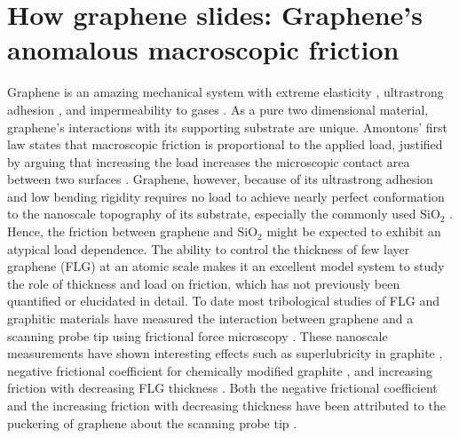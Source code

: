 \chapter{How graphene slides: Graphene's anomalous macroscopic friction \label{chap:fri}}

Graphene is an amazing mechanical system with extreme elasticity \cite{Lee2008}, ultrastrong adhesion \cite{Koenig2011}, and impermeability to gases \cite{Bunch2008}.
As a pure two dimensional material, graphene's interactions with its supporting substrate are unique.
Amontons' first law states that macroscopic friction is proportional to the applied load, justified by arguing that increasing the load increases the microscopic contact area between two surfaces \cite{Krim1996}.
Graphene, however, because of its ultrastrong adhesion \cite{Koenig2011} and low bending rigidity requires no load to achieve nearly perfect conformation to the nanoscale topography of its substrate, especially the commonly used $\mathrm{SiO_2}$ \cite{Stolyarova2007,Lui2009,Cullen2010}.
Hence, the friction between graphene and $\mathrm{SiO_2}$ might be expected to exhibit an atypical load dependence.
The ability to control the thickness of few layer graphene (FLG) at an atomic scale makes it an excellent model system to study the role of thickness and load on friction, which has not previously been quantified or elucidated in detail.
To date most tribological studies of FLG and graphitic materials have measured the interaction between graphene and a scanning probe tip using frictional force microscopy \cite{Dienwiebel2004,Deng2012,Lee2010,Li2010c,Filleter2009,Filleter2010,Zhang2012a}.
These nanoscale measurements have shown interesting effects such as superlubricity in graphite \cite{Dienwiebel2004}, negative frictional coefficient for chemically modified graphite \cite{Deng2012}, and increasing friction with decreasing FLG thickness \cite{Lee2010,Li2010c,Filleter2009,Filleter2010}.
Both the negative frictional coefficient and the increasing friction with decreasing thickness have been attributed to the puckering of graphene about the scanning probe tip \cite{Lee2010,Li2010c,Deng2012}.

